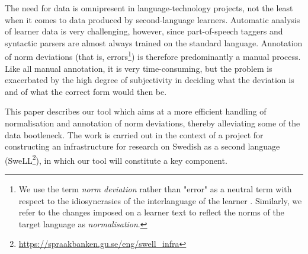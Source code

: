 \documentclass[10pt, a4paper]{article}
\newcommand{\normAnn}[0]{our tool }
\begin{document}
The need for data is omnipresent in language-technology projects, not the least when it comes to data produced by second-language learners.
Automatic analysis of learner data is very challenging, however, since part-of-speech taggers and syntactic parsers are almost always trained on the standard language. Annotation of norm deviations (that is, errors\footnote{We use the term {\em norm deviation} rather than "error" as a neutral term with respect to the idiosyncrasies of the interlanguage of the learner \cite{Selinker1972}. Similarly, we refer to the changes imposed on a learner text to reflect the norms of the target language as {\em normalisation}. }) is therefore predominantly a manual process. Like all manual annotation, it is very time-consuming, but the problem is exacerbated by the high degree of subjectivity in deciding what the deviation is and of what the correct form would then be.

This paper describes %
\normAnn which aims at a more efficient handling of normalisation and annotation of norm deviations, thereby alleviating some of the data bootleneck. The work is carried out in the context of a project for constructing an infrastructure for research on Swedish as a second language (SweLL\footnote{%
{\scriptsize\url{https://spraakbanken.gu.se/eng/swell_infra}}}), in which \normAnn will constitute a key component.


\end{document}
